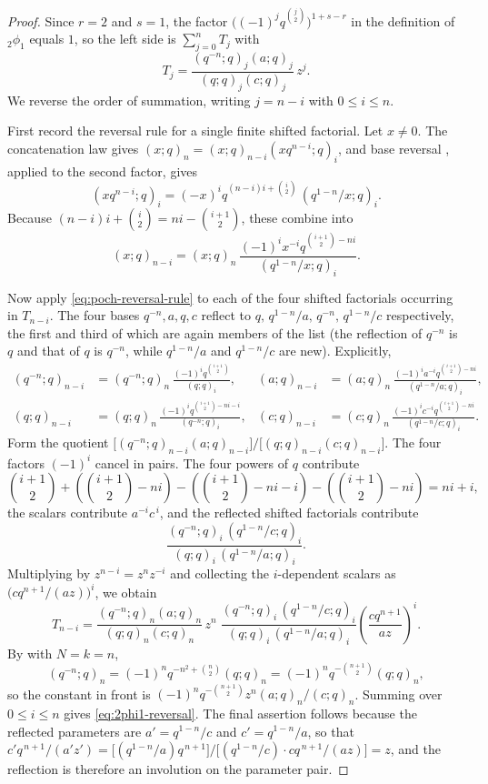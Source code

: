 \documentclass[11pt,oneside,openany]{book}
\theoremstyle{definition}
\theoremstyle{remark}
\begin{document}
\begin{proof}
Since $r=2$ and $s=1$, the factor $\bigl((-1)^jq^{\binom j2}\bigr)^{1+s-r}$ in the definition of ${}_2\phi_1$ equals $1$, so the left side is $\sum_{j=0}^{n}T_j$ with
\[
 T_j=\frac{(q^{-n};q)_j(a;q)_j}{(q;q)_j(c;q)_j}\,z^{j}.
\]
We reverse the order of summation, writing $j=n-i$ with $0\le i\le n$.

First record the reversal rule for a single finite shifted factorial.  Let $x\ne0$.  The concatenation law  gives $(x;q)_n=(x;q)_{n-i}(xq^{n-i};q)_i$, and base reversal , applied to the second factor, gives
\[
 (xq^{n-i};q)_i=(-x)^iq^{(n-i)i+\binom i2}\,(q^{1-n}/x;q)_i .
\]
Because $(n-i)i+\binom i2=ni-\binom{i+1}{2}$, these combine into
\begin{equation}
 (x;q)_{n-i}=(x;q)_n\,
 \frac{(-1)^i x^{-i}q^{\binom{i+1}{2}-ni}}{(q^{1-n}/x;q)_i}.
 \label{eq:poch-reversal-rule}
\end{equation}

Now apply \eqref{eq:poch-reversal-rule} to each of the four shifted factorials occurring in $T_{n-i}$.  The four bases $q^{-n},a,q,c$ reflect to $q,\,q^{1-n}/a,\,q^{-n},\,q^{1-n}/c$ respectively, the first and third of which are again members of the list (the reflection of $q^{-n}$ is $q$ and that of $q$ is $q^{-n}$, while $q^{1-n}/a$ and $q^{1-n}/c$ are new).  Explicitly,
\begin{align*}
 (q^{-n};q)_{n-i}&=(q^{-n};q)_n\,
 \frac{(-1)^iq^{\binom{i+1}{2}}}{(q;q)_i},
 &
 (a;q)_{n-i}&=(a;q)_n\,
 \frac{(-1)^ia^{-i}q^{\binom{i+1}{2}-ni}}{(q^{1-n}/a;q)_i},\\
 (q;q)_{n-i}&=(q;q)_n\,
 \frac{(-1)^iq^{\binom{i+1}{2}-ni-i}}{(q^{-n};q)_i},
 &
 (c;q)_{n-i}&=(c;q)_n\,
 \frac{(-1)^ic^{-i}q^{\binom{i+1}{2}-ni}}{(q^{1-n}/c;q)_i}.
\end{align*}
Form the quotient $\bigl[(q^{-n};q)_{n-i}(a;q)_{n-i}\bigr]\big/\bigl[(q;q)_{n-i}(c;q)_{n-i}\bigr]$.  The four factors $(-1)^i$ cancel in pairs.  The four powers of $q$ contribute
\[
 \binom{i+1}{2}
 +\left(\binom{i+1}{2}-ni\right)
 -\left(\binom{i+1}{2}-ni-i\right)
 -\left(\binom{i+1}{2}-ni\right)
 =ni+i,
\]
the scalars contribute $a^{-i}c^{\,i}$, and the reflected shifted factorials
contribute
\[
 \frac{(q^{-n};q)_i\,(q^{1-n}/c;q)_i}{(q;q)_i\,(q^{1-n}/a;q)_i}.
\]
Multiplying by $z^{n-i}=z^{n}z^{-i}$ and collecting the $i$-dependent
scalars as $\bigl(cq^{n+1}/(az)\bigr)^{i}$, we obtain
\[
 T_{n-i}
 =\frac{(q^{-n};q)_n(a;q)_n}{(q;q)_n(c;q)_n}\,z^{n}\;
 \frac{(q^{-n};q)_i\,(q^{1-n}/c;q)_i}
 {(q;q)_i\,(q^{1-n}/a;q)_i}
 \left(\frac{cq^{n+1}}{az}\right)^{i}.
\]
By  with $N=k=n$,
\[
 (q^{-n};q)_n=(-1)^nq^{-n^2+\binom n2}(q;q)_n
 =(-1)^nq^{-\binom{n+1}{2}}(q;q)_n,
\]
so the constant in front is $(-1)^nq^{-\binom{n+1}{2}}z^{n}(a;q)_n/(c;q)_n$.  Summing over $0\le i\le n$ gives \eqref{eq:2phi1-reversal}.  The final assertion follows because the reflected parameters are $a'=q^{1-n}/c$ and $c'=q^{1-n}/a$, so that $c'q^{\,n+1}/(a'z')=\bigl[(q^{1-n}/a)q^{\,n+1}\bigr]\big/\bigl[(q^{1-n}/c)\cdot cq^{\,n+1}/(az)\bigr]=z$, and the reflection is therefore an involution on the parameter pair.
\end{proof}
\end{document}
